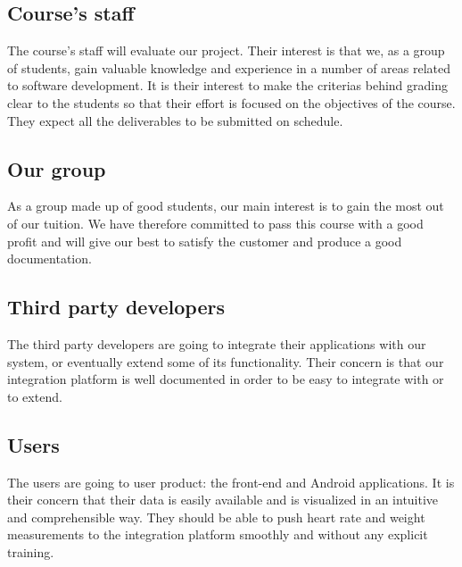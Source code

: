 \subsection{Course's staff}
The course's staff will evaluate our project. Their interest is that we, as a group of students,
gain valuable knowledge and experience in a number of areas related to software development.
It is their interest to make the criterias behind grading clear to the students
so that their effort is focused on the objectives of the course.
They expect all the deliverables to be submitted on schedule.

\subsection{Our group}
As a group made up of good students, our main interest is to gain the most out of our tuition.
We have therefore committed to pass this course with a good profit and will give our best
to satisfy the customer and produce a good documentation.

\subsection{Third party developers}
The third party developers are going to integrate their applications with our system, or eventually
extend some of its functionality. Their concern is that our integration platform is well documented
in order to be easy to integrate with or to extend.

\subsection{Users}
The users are going to user product: the front-end and Android applications.
It is their concern that their data is easily available and is visualized in an intuitive and comprehensible way.
They should be able to push heart rate and weight measurements to the integration platform smoothly and without
any explicit training.


\newpage
